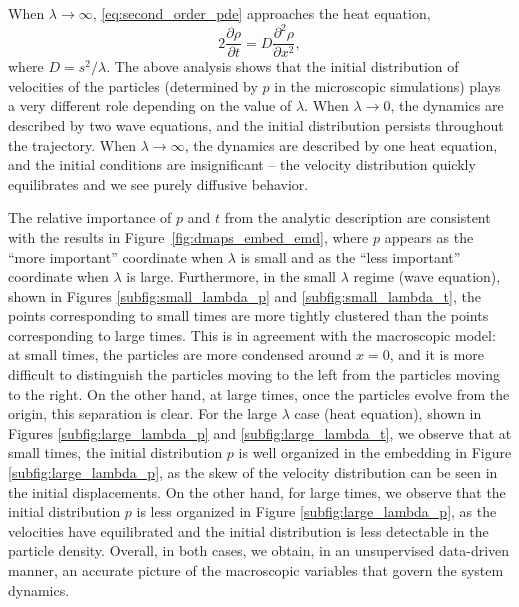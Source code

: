\documentclass[preprint]{elsarticle}
\begin{document}
When $\lambda \rightarrow \infty$, \eqref{eq:second_order_pde} approaches the heat equation,
\begin{equation}
2 \frac{\partial \rho}{\partial t} = D \frac{\partial ^2 \rho}{\partial x^2},
\end{equation}
%
where $D=s^2/\lambda$.
%
%
The above analysis shows that the initial distribution of velocities of the particles (determined by $p$ in the microscopic simulations) plays a very different role depending on the value of $\lambda$.
%
When $\lambda \rightarrow 0$, the dynamics are described by two wave equations, and the initial distribution persists throughout the trajectory.
%
When $\lambda \rightarrow \infty$, the dynamics are described by one heat equation, and the initial conditions are insignificant -- the velocity distribution quickly equilibrates and we see purely diffusive behavior.
%

The relative importance of $p$ and $t$ from the analytic description are consistent with the results in Figure~\ref{fig:dmaps_embed_emd}, where $p$ appears as the ``more important'' coordinate when $\lambda$ is small and as the ``less important'' coordinate when $\lambda$ is large. 
%
Furthermore, in the small $\lambda$ regime (wave equation), shown in Figures \ref{subfig:small_lambda_p} and \ref{subfig:small_lambda_t}, the points corresponding to small times are more tightly clustered than the points corresponding to large times.
%
This is in agreement with the macroscopic model: at small times, the particles are more condensed around $x=0$, and it is more difficult to distinguish the particles moving to the left from the particles moving to the right. 
%
On the other hand, at large times, once the particles evolve from the origin, this separation is clear.  
%
For the large $\lambda$ case (heat equation), shown in Figures \ref{subfig:large_lambda_p} and \ref{subfig:large_lambda_t}, we observe that at small times, the initial distribution $p$ is well organized in the embedding in Figure \ref{subfig:large_lambda_p}, as the skew of the velocity distribution can be seen in the initial displacements.
%
On the other hand, for large times, we observe that the initial distribution $p$ is less organized in Figure \ref{subfig:large_lambda_p}, as the velocities have equilibrated and the initial distribution is less detectable in the particle density.
%
Overall, in both cases, we obtain, in an unsupervised data-driven manner, an accurate picture of the macroscopic variables that govern the system dynamics.
\end{document}
